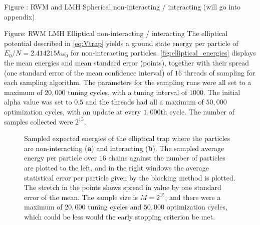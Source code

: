 Figure : RWM and LMH Spherical non-interacting / interacting (will go into appendix)

Figure: RWM LMH Elliptical non-interacting / interacting  
The elliptical potential described in \autoref{eq:Vtrap} yields a ground state energy per particle of $E_0/N = 2.414215 \hbar\omega_0$ for non-interacting particles. \autoref{fig:elliptical_energies} displays the mean energies and mean standard error (points), together with their spread (one standard error of the mean confidence interval)  of $16$ threads of sampling for each sampling algorithm. The parameters for the sampling runs were all set to a maximum of $20,000$ tuning cycles, with a tuning interval of $1000$. The initial alpha value was set to $0.5$ and the threads had all a maximum of $50,000$ optimization cycles, with an update at every $1,000$th cycle. The number of samples collected were $2^{15}$. 

\begin{figure}[!htb]
\centering
{}
\qquad
{}
\caption{Sampled expected energies of the elliptical trap where the particles are non-interacting (\textbf{a}) and interacting (\textbf{b}). The sampled average energy per particle over $16$ chains against the number of particles are plotted to the left, and in the right windows the average statistical error per particle given by the blocking method is plotted. The stretch in the points shows spread in value by one standard error of the mean. The sample size is $M=2^{15}$, and there were a maximum of $20,000$ tuning cycles and $50,000$ optimization cycles, which could be less would the early stopping criterion be met.}
\label{fig:elliptical_energies}
\end{figure}

